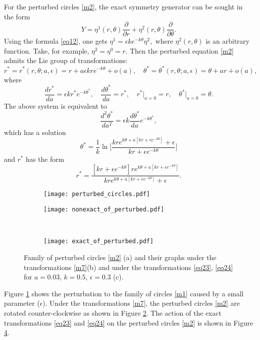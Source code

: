 \documentclass[11pt,letter,subeqn]{article}
\def\beq{\begin{equation}}
\def\eeq{\end{equation}}
\begin{document}
For the perturbed circles \eqref{m2}, the exact symmetry generator can be sought in the form
\begin{equation}\label{eq20}
  Y= \eta^1(r,\theta) \dfrac{\partial}{\partial r}+ \eta^2(r,\theta) \dfrac{\partial}{\partial \theta}.
\end{equation}
Using the formula \eqref{eq12}, one gets $\eta^1= \epsilon k e^{-k \theta}\eta^2,$ where $\eta^2(r,\theta)$ is an arbitrary function. Take, for example, $\eta^2=\eta^0=r.$ Then the perturbed equation \eqref{m2} admits the Lie group of transformations:
\beq\label{m7}
  {r^*} =r^*(r,\theta;a,\epsilon)= r+a\epsilon kr e^{-k \theta}+o(a), \quad
  {\theta^*} =\theta^*(r,\theta;a,\epsilon)= \theta+ar+o(a),
\eeq
where
\beq
\dfrac{d{r^*}}{da} = \epsilon k r^* e^{-k {\theta^*}},\quad \dfrac{d{\theta^*}}{da} = r^*,\quad {r^*}\bigg|_{a=0}=r,\quad {\theta^*}\bigg|_{a=0}=\theta.
\eeq
   The above system is equivalent to
   \begin{equation}\label{m8}
     \dfrac{d^2{\theta^*}}{da^2}= \epsilon k  \dfrac{d{\theta^*}}{da} e^{-k {\theta^*}},
   \end{equation}
    which has a solution
   \begin{equation}\label{eq23}
     \theta^*=\dfrac{1}{k} \ln \bigg[\dfrac{kre^{k \theta +a[kr+\epsilon e^{-k {\theta}} ]}+\epsilon}{kr+\epsilon e^{-k {\theta}}}\bigg]
   \end{equation}
   and $r^*$ has the form
   \begin{equation}\label{eq24}
     r^*=\dfrac{[kr+\epsilon e^{-k {\theta}}]re^{k \theta+a[kr+\epsilon e^{-k {\theta}}]}}{kre^{k \theta+a[kr+\epsilon e^{-k {\theta}}]}+\epsilon}.
   \end{equation}
   \begin{figure}[H]
	\begin{subfigure}{.4\textwidth}
		\texttt{[image: perturbed\_circles.pdf]}
		\caption{ }\label{fig2a}
	\end{subfigure} \hfill
	\begin{subfigure}{.4\textwidth}
		\texttt{[image: nonexact\_of\_perturbed.pdf]}
		\caption{}\label{fig2b}
	\end{subfigure}\\
\centering
\begin{subfigure}{.4\textwidth}
		\texttt{[image: exact\_of\_perturbed.pdf]}
		\caption{ }\label{fig2c}
	\end{subfigure}
%
\caption[]{
Family of perturbed circles \eqref{m2} (a) and their graphs under the transformations \eqref{m7}(b) and under the transformations \eqref{eq23}, \eqref{eq24} for $a=0.03$, $k=0.5$, $\epsilon=0.3$ (c).}%
\end{figure}
Figure \ref{fig2a} shows the perturbation to the family of circles \eqref{m1} caused by a small parameter ($\epsilon$). Under the transformations \eqref{m7}, the perturbed circles \eqref{m2} are rotated counter-clockwise as shown in Figure \ref{fig2b}. The action of the exact transformations \eqref{eq23} and \eqref{eq24} on the perturbed circles \eqref{m2} is shown in Figure \ref{fig2c}.
\end{document}
